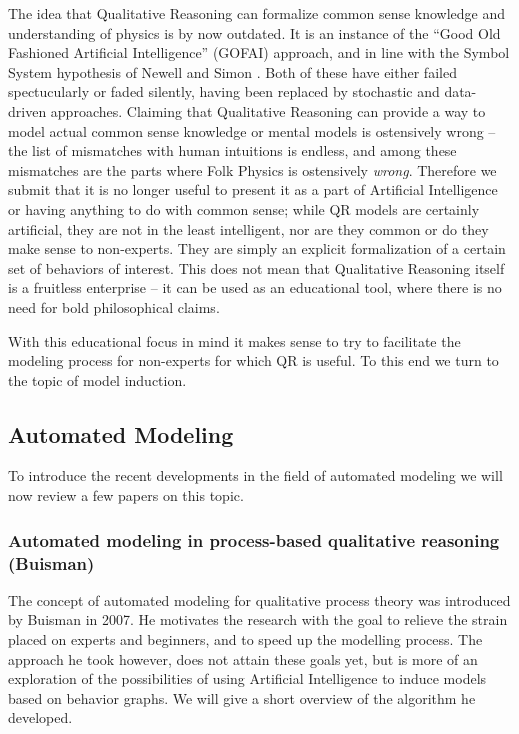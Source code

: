 \documentclass{article}
\begin{document}
The idea that Qualitative Reasoning can formalize common sense knowledge and
understanding of physics is by now outdated. It is an instance of the ``Good
Old Fashioned Artificial Intelligence'' (GOFAI) approach, and in line with the
Symbol System hypothesis of Newell and Simon \cite{newell}.
Both of these have either failed spectucularly or faded silently, having been
replaced by stochastic and data-driven approaches.  Claiming that Qualitative
Reasoning can provide a way to model actual common sense knowledge or mental
models is ostensively wrong -- the list of mismatches with human intuitions is
endless, and among these mismatches are the parts where Folk Physics is
ostensively {\em wrong}. Therefore we submit that it is no longer useful to
present it as a part of Artificial Intelligence or having anything to do with
common sense; while QR models are certainly artificial, they are not in the
least intelligent, nor are they common or do they make sense to non-experts.
They are simply an explicit formalization of a certain set of behaviors of
interest. This does not mean that Qualitative Reasoning itself is a fruitless
enterprise -- it can be used as an educational tool, where there is no need for
bold philosophical claims.

With this educational focus in mind it makes sense to try to facilitate the
modeling process for non-experts for which QR is useful. To this end we turn to
the topic of model induction.

\subsection{Automated Modeling}

To introduce the recent developments in the field of automated modeling we
will now review a few papers on this topic.

\subsubsection{Automated modeling in process-based qualitative reasoning
(Buisman)}
The concept of automated modeling for qualitative process theory was introduced
by Buisman \cite{buisman} in 2007. He motivates the research with the goal to
relieve the strain placed on experts and beginners, and to speed up the
modelling process. The approach he took however, does not attain these
goals yet, but is more of an exploration of the possibilities of using
Artificial Intelligence to induce models based on behavior graphs. We will give
a short overview of the algorithm he developed.
\end{document}
